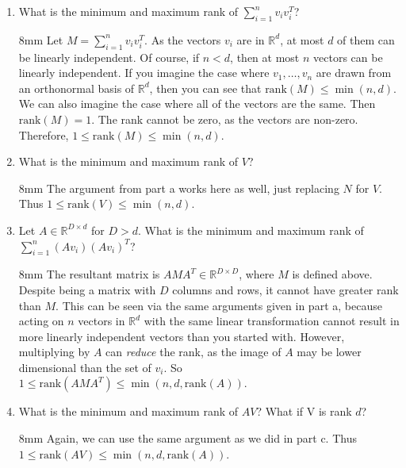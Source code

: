 \documentclass{article}
\newenvironment{solution}{\begin{adjustwidth}{8mm}{}}{\end{adjustwidth}}
\begin{document}
\begin{enumerate}
        \item What is the minimum and maximum rank of $\sum_{i=1}^n v_i v_i^T$?
        \begin{solution}
                Let $M = \sum_{i=1}^n v_i v_i^T$.
                As the vectors $v_i$ are in $\mathbb{R}^d$, at most $d$ of them can be linearly independent.
                Of course, if $n < d$, then at most $n$ vectors can be linearly independent.
                If you imagine the case where $v_1, \dots, v_n$ are drawn from an orthonormal basis of $\mathbb{R}^d$, then you can see that $\text{rank}(M) \leq \min(n,d)$.
                We can also imagine the case where all of the vectors are the same.
                Then $\text{rank}(M) = 1$.
                The rank cannot be zero, as the vectors are non-zero.
                Therefore, $1 \leq \text{rank}(M) \leq \min(n,d)$.
        \end{solution}
        \item What is the minimum and maximum rank of $V$?
        \begin{solution}
                The argument from part a works here as well, just replacing $N$ for $V$.
                Thus $1 \leq \text{rank}(V) \leq \min(n,d)$.
        \end{solution}
        \item Let $A \in \mathbb{R}^{D \times d}$ for $D > d$.
                What is the minimum and maximum rank of $\sum_{i=1}^n (Av_i)(Av_i)^T$?
        \begin{solution}
                The resultant matrix is $AMA^T \in \mathbb{R}^{D \times D}$, where $M$ is defined above.
                Despite being a matrix with $D$ columns and rows, it cannot have greater rank than $M$.
                This can be seen via the same arguments given in part a, because acting on $n$ vectors in $\mathbb{R}^d$ with the same linear transformation cannot result in more linearly independent vectors than you started with.
                However, multiplying by $A$ can \textit{reduce} the rank, as the image of $A$ may be lower dimensional than the set of $v_i$.
                So $1 \leq \text{rank}(AMA^T) \leq \min(n,d, \text{rank}(A))$.
        \end{solution}
        \item What is the minimum and maximum rank of $AV$?
                What if V is rank $d$?
        \begin{solution}
                Again, we can use the same argument as we did in part c.
                Thus $1 \leq \text{rank}(AV) \leq \min(n,d, \text{rank}(A))$.
        \end{solution}
\end{enumerate}
\end{document}
